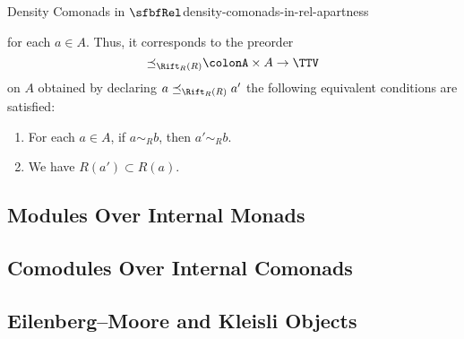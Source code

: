 \begin{example}{Density Comonads in $\sfbfRel$}{density-comonads-in-rel-apartness}
\begin{enumerate}
\begin{webcompile}
                \quad
            \end{webcompile}
            for each $a\in A$. Thus, it corresponds to the preorder
            \[
                \mathord{\preceq_{\Rift_{R}(R)}}%
                \colon%
                A\times A%
                \to%
                \TTV%
            \]%
            on $A$ obtained by declaring $a\preceq_{\Rift_{R}(R)}a'$ \textiff the following equivalent conditions are satisfied:
            \begin{enumerate}
                \item\label{density-comonads-in-rel-apartness-2-a}For each $a\in A$, if $a\sim_{R}b$, then $a'\sim_{R}b$.
                \item\label{density-comonads-in-rel-apartness-2-b}We have $R(a')\subset R(a)$.
            \end{enumerate}
    \end{enumerate}
\end{example}
\subsection{Modules Over Internal Monads}\label{subsection-modules-over-internal-monads-in-rel-apartness}
\subsection{Comodules Over Internal Comonads}\label{subsection-comodules-over-internal-comonads-in-rel-apartness}
\subsection{Eilenberg--Moore and Kleisli Objects}\label{subsection-eilenberg-moore-and-kleisli-objects-in-rel-apartness}
